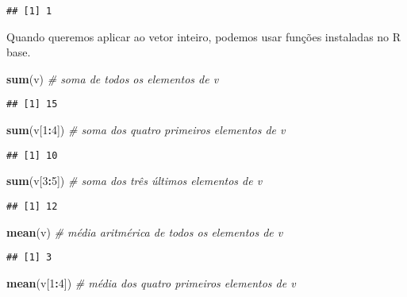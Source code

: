 \documentclass[
]{book}
\newenvironment{Shaded}{\begin{snugshade}}{\end{snugshade}}
\newcommand{\CommentTok}[1]{\textcolor[rgb]{0.56,0.35,0.01}{\textit{#1}}}
\newcommand{\DecValTok}[1]{\textcolor[rgb]{0.00,0.00,0.81}{#1}}
\newcommand{\KeywordTok}[1]{\textcolor[rgb]{0.13,0.29,0.53}{\textbf{#1}}}
\newcommand{\NormalTok}[1]{#1}
\newcommand{\OperatorTok}[1]{\textcolor[rgb]{0.81,0.36,0.00}{\textbf{#1}}}
\begin{document}
\begin{verbatim}
## [1] 1
\end{verbatim}

Quando queremos aplicar ao vetor inteiro, podemos usar funções instaladas no R base.

\begin{Shaded}
\begin{Highlighting}[]
\KeywordTok{sum}\NormalTok{(v) }\CommentTok{# soma de todos os elementos de v}
\end{Highlighting}
\end{Shaded}

\begin{verbatim}
## [1] 15
\end{verbatim}

\begin{Shaded}
\begin{Highlighting}[]
\KeywordTok{sum}\NormalTok{(v[}\DecValTok{1}\OperatorTok{:}\DecValTok{4}\NormalTok{]) }\CommentTok{# soma dos quatro primeiros elementos de v}
\end{Highlighting}
\end{Shaded}

\begin{verbatim}
## [1] 10
\end{verbatim}

\begin{Shaded}
\begin{Highlighting}[]
\KeywordTok{sum}\NormalTok{(v[}\DecValTok{3}\OperatorTok{:}\DecValTok{5}\NormalTok{]) }\CommentTok{# soma dos três últimos elementos de v}
\end{Highlighting}
\end{Shaded}

\begin{verbatim}
## [1] 12
\end{verbatim}

\begin{Shaded}
\begin{Highlighting}[]
\KeywordTok{mean}\NormalTok{(v) }\CommentTok{# média aritmérica de todos os elementos de v}
\end{Highlighting}
\end{Shaded}

\begin{verbatim}
## [1] 3
\end{verbatim}

\begin{Shaded}
\begin{Highlighting}[]
\KeywordTok{mean}\NormalTok{(v[}\DecValTok{1}\OperatorTok{:}\DecValTok{4}\NormalTok{]) }\CommentTok{# média dos quatro primeiros elementos de v}
\end{Highlighting}
\end{Shaded}
\end{document}
